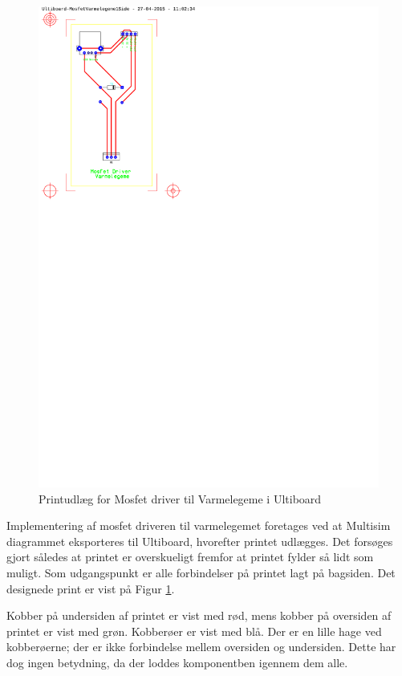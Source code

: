 \begin{figure}[h]
\centering 
\includegraphics[width={\textwidth-8cm}, trim=50 520 390 30, clip=true, angle =90] {../fig/ultiboard_varmelegeme.pdf}
\caption{Printudlæg for Mosfet driver til Varmelegeme i Ultiboard}
\label{fig:ultiboard_varmelegeme}
\end{figure}

Implementering af mosfet driveren til varmelegemet foretages ved at Multisim diagrammet eksporteres til Ultiboard, hvorefter printet udlægges.
Det forsøges gjort således at printet er overskueligt fremfor at printet fylder så lidt som muligt. 
Som udgangspunkt er alle forbindelser på printet lagt på bagsiden. 
Det designede print er vist på Figur \ref{fig:ultiboard_varmelegeme}. 

Kobber på undersiden af printet er vist med rød, mens kobber på oversiden af printet er vist med grøn. 
Kobberøer er vist med blå.
Der er en lille hage ved kobberøerne; der er ikke forbindelse mellem oversiden og undersiden. 
Dette har dog ingen betydning, da der loddes komponentben igennem dem alle. 

